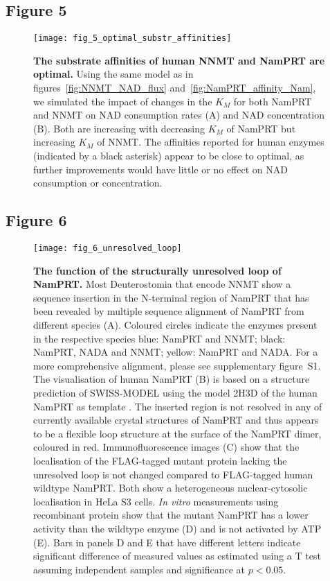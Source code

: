 \newpage


\subsection*{Figure 5}

\begin{figure}[ht]
  \centering
  \texttt{[image: fig\_5\_optimal\_substr\_affinities]}
  \caption{\textbf{The substrate affinities of human NNMT and NamPRT are optimal.} Using the same model as in figures~\ref{fig:NNMT_NAD_flux} and~\ref{fig:NamPRT_affinity_Nam}, we simulated the impact of changes in the $K_{M}$ for both NamPRT and NNMT on NAD consumption rates (A) and NAD concentration (B). Both are increasing with decreasing $K_{M}$ of NamPRT but increasing $K_{M}$ of NNMT. The affinities reported for human enzymes (indicated by a black asterisk) appear to be close to optimal, as further improvements would have little or no effect on NAD consumption or concentration.}
  \label{fig:optimal_substr_affinities}
\end{figure}

\newpage


\subsection*{Figure 6}

\begin{figure}[ht]
  \centering
  \texttt{[image: fig\_6\_unresolved\_loop]}
  \caption{\textbf{The function of the structurally unresolved loop of NamPRT.} Most Deuterostomia that encode NNMT show a sequence insertion in the N-terminal region of NamPRT that has been revealed by multiple sequence alignment of NamPRT from different species (A). Coloured circles indicate the enzymes present in the respective species blue: NamPRT and NNMT; black: NamPRT, NADA and NNMT; yellow: NamPRT and NADA. For a more comprehensive alignment, please see supplementary figure~S1. The visualisation of human NamPRT (B) is based on a structure prediction of SWISS-MODEL \cite{Arnold2006,Biasini2014} using the model 2H3D of the human NamPRT as template \cite{Wang2006}. The inserted region is not resolved in any of currently available crystal structures of NamPRT and thus appears to be a flexible loop structure at the surface of the NamPRT dimer, coloured in red. Immunofluorescence images (C) show that the localisation of the FLAG-tagged mutant protein lacking the unresolved loop  is not changed compared to FLAG-tagged human wildtype NamPRT. Both show a heterogeneous nuclear-cytosolic localisation in HeLa S3 cells. \textit{In vitro} measurements using recombinant protein show that the mutant NamPRT has a lower activity than the wildtype enzyme (D) and is not activated by ATP (E). Bars in panels D and E that have different letters indicate significant difference of measured values as estimated using a T test assuming independent samples and significance at $p < 0.05$.}
  \label{fig:unresolved_loop}
\end{figure}

